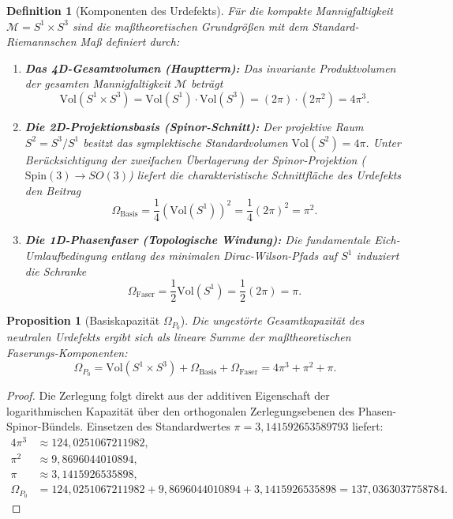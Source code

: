 \documentclass[11pt,a4paper]{article}
\newtheorem{proposition}[theorem]{Proposition}
\newtheorem{definition}[theorem]{Definition}
\begin{document}
\begin{definition}[Komponenten des Urdefekts]
Für die kompakte Mannigfaltigkeit $\mathcal{M} = S^1 \times S^3$ sind die maßtheoretischen Grundgrößen mit dem Standard-Riemannschen Maß definiert durch:
\begin{enumerate}\itemsep2pt \parskip0pt 
    \item \textbf{Das 4D-Gesamtvolumen (Hauptterm):} Das invariante Produktvolumen der gesamten Mannigfaltigkeit $\mathcal{M}$ beträgt
    \begin{equation}
    \mathrm{Vol}(S^1 \times S^3) = \mathrm{Vol}(S^1) \cdot \mathrm{Vol}(S^3) = (2\pi) \cdot (2\pi^2) = 4\pi^3.
    \end{equation}
    \item \textbf{Die 2D-Projektionsbasis (Spinor-Schnitt):} Der projektive Raum $S^2 = S^3 / S^1$ besitzt das symplektische Standardvolumen $\mathrm{Vol}(S^2) = 4\pi$. Unter Berücksichtigung der zweifachen Überlagerung der Spinor-Projektion ($\mathrm{Spin}(3) \to SO(3)$) liefert die charakteristische Schnittfläche des Urdefekts den Beitrag
    \begin{equation}
    \Omega_{\text{Basis}} = \frac{1}{4} \left(\mathrm{Vol}(S^1)\right)^2 = \frac{1}{4} (2\pi)^2 = \pi^2.
    \end{equation}
    \item \textbf{Die 1D-Phasenfaser (Topologische Windung):} Die fundamentale Eich-Umlaufbedingung entlang des minimalen Dirac-Wilson-Pfads auf $S^1$ induziert die Schranke
    \begin{equation}
    \Omega_{\text{Faser}} = \frac{1}{2} \mathrm{Vol}(S^1) = \frac{1}{2} (2\pi) = \pi.
    \end{equation}
\end{enumerate}
\end{definition}

\begin{proposition}[Basiskapazität $\Omega_{P_0}$]
Die ungestörte Gesamtkapazität des neutralen Urdefekts ergibt sich als lineare Summe der maßtheoretischen Faserungs-Komponenten:
\begin{equation}
\Omega_{P_0} = \mathrm{Vol}(S^1 \times S^3) + \Omega_{\text{Basis}} + \Omega_{\text{Faser}} = 4\pi^3 + \pi^2 + \pi.
\label{eq:base_omega}
\end{equation}
\end{proposition}

\begin{proof}
Die Zerlegung folgt direkt aus der additiven Eigenschaft der logarithmischen Kapazität über den orthogonalen Zerlegungsebenen des Phasen-Spinor-Bündels. Einsetzen des Standardwertes $\pi = 3{,}141592653589793$ liefert:
\begin{align}
4\pi^3 &\approx 124{,}0251067211982, \nonumber \\
\pi^2 &\approx 9{,}8696044010894, \nonumber \\
\pi &\approx 3{,}1415926535898, \nonumber \\
\Omega_{P_0} &= 124{,}0251067211982 + 9{,}8696044010894 + 3{,}1415926535898 = 137{,}0363037758784.
\end{align}
\end{proof}
\end{document}
